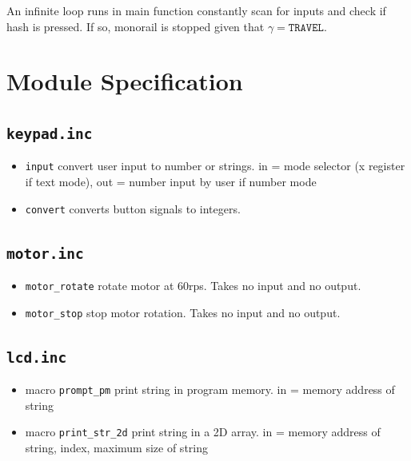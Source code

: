 \documentclass[a4paper,12pt]{article}
\begin{document}
An infinite loop runs in main function constantly scan for inputs and check if hash is pressed. If so, monorail is stopped given that $\gamma = \texttt{TRAVEL}$.

\section{Module Specification}
\subsection{\texttt{keypad.inc}}
\begin{itemize}
    \item \texttt{input} convert user input to number or strings. in = mode selector (x register if text mode), out = number input by user if number mode
    \item \texttt{convert} converts button signals to integers.
\end{itemize}
\subsection{\texttt{motor.inc}}
\begin{itemize}
    \item \texttt{motor\_rotate} rotate motor at 60rps. Takes no input and no output.
    \item \texttt{motor\_stop} stop motor rotation. Takes no input and no output.
\end{itemize}
\subsection{\texttt{lcd.inc}}
\begin{itemize}
    \item macro \texttt{prompt\_pm} print string in program memory. in = memory address of string
    \item macro \texttt{print\_str\_2d} print string in a 2D array. in = memory address of string, index, maximum size of string 
\end{itemize}
\end{document}
